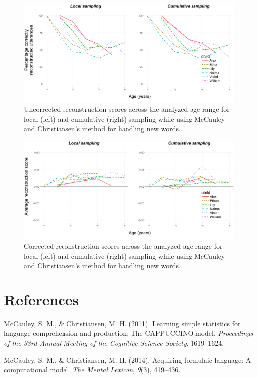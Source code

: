 \documentclass[
  english,
  man,floatsintext]{apa6}
\begin{document}
\begin{figure}

{\centering \includegraphics[width=0.95\linewidth]{images/suppl_bothreconperc} 

}

\caption{Uncorrected reconstruction scores across the analyzed age range for local (left) and cumulative (right) sampling while using McCauley and Christiansen's method for handling new words.}\label{fig:smfig1}
\end{figure}

\begin{figure}

{\centering \includegraphics[width=0.95\linewidth]{images/suppl_bothreconscore} 

}

\caption{Corrected reconstruction scores across the analyzed age range for local (left) and cumulative (right) sampling while using McCauley and Christiansen's method for handling new words.}\label{fig:smfig2}
\end{figure}

\newpage

\hypertarget{references}{%
\section{References}\label{references}}

\begingroup
\setlength{\parindent}{-0.5in}
\setlength{\leftskip}{0.5in}

\hypertarget{refs}{}
\leavevmode\hypertarget{ref-mccauley2011learning}{}%
McCauley, S. M., \& Christiansen, M. H. (2011). Learning simple statistics for language comprehension and production: The CAPPUCCINO model. \emph{Proceedings of the 33rd Annual Meeting of the Cognitive Science Society}, 1619--1624.

\leavevmode\hypertarget{ref-mccauley2014acquiring}{}%
McCauley, S. M., \& Christiansen, M. H. (2014). Acquiring formulaic language: A computational model. \emph{The Mental Lexicon}, \emph{9}(3), 419--436.

\endgroup
\end{document}
